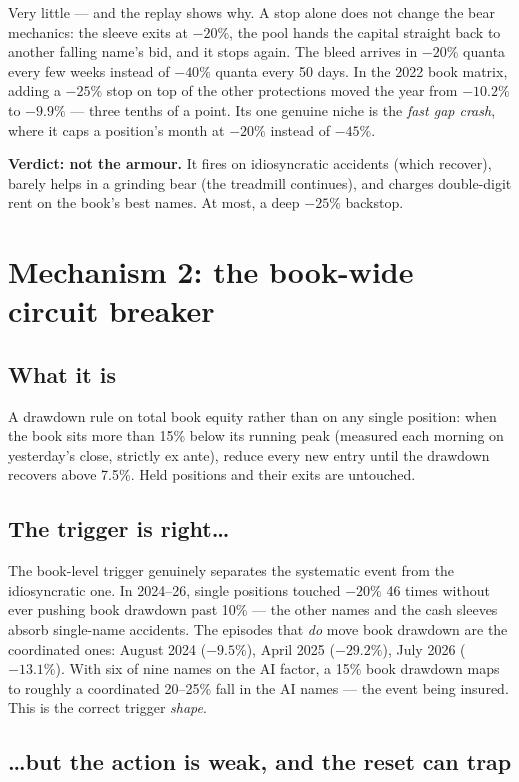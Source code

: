 \documentclass[11pt,a4paper]{article}
\begin{document}
Very little --- and the replay shows why. A stop alone does not change the bear
mechanics: the sleeve exits at $-20\%$, the pool hands the capital straight back
to another falling name's bid, and it stops again. The bleed arrives in $-20\%$
quanta every few weeks instead of $-40\%$ quanta every 50 days. In the 2022 book
matrix, adding a $-25\%$ stop on top of the other protections moved the year from
$-10.2\%$ to $-9.9\%$ --- three tenths of a point. Its one genuine niche is the
\emph{fast gap crash}, where it caps a position's month at $-20\%$ instead of
$-45\%$.

\textbf{Verdict: not the armour.} It fires on idiosyncratic accidents (which
recover), barely helps in a grinding bear (the treadmill continues), and charges
double-digit rent on the book's best names. At most, a deep $-25\%$ backstop.

\section{Mechanism 2: the book-wide circuit breaker}

\subsection{What it is}

A drawdown rule on total book equity rather than on any single position: when the
book sits more than 15\% below its running peak (measured each morning on
yesterday's close, strictly ex ante), reduce every new entry until the drawdown
recovers above 7.5\%. Held positions and their exits are untouched.

\subsection{The trigger is right\ldots}

The book-level trigger genuinely separates the systematic event from the
idiosyncratic one. In 2024--26, single positions touched $-20\%$ 46 times without
ever pushing book drawdown past 10\% --- the other names and the cash sleeves
absorb single-name accidents. The episodes that \emph{do} move book drawdown are
the coordinated ones: August 2024 ($-9.5\%$), April 2025 ($-29.2\%$), July 2026
($-13.1\%$). With six of nine names on the AI factor, a 15\% book drawdown maps
to roughly a coordinated 20--25\% fall in the AI names --- the event being
insured. This is the correct trigger \emph{shape}.

\subsection{\ldots but the action is weak, and the reset can trap}
\end{document}
